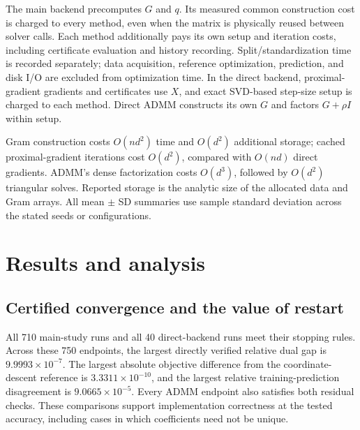 \documentclass{article}
\begin{document}
The main backend precomputes $G$ and $q$. Its measured common construction cost is charged to every method, even when the matrix is physically reused between solver calls. Each method additionally pays its own setup and iteration costs, including certificate evaluation and history recording. Split/standardization time is recorded separately; data acquisition, reference optimization, prediction, and disk I/O are excluded from optimization time. In the direct backend, proximal-gradient gradients and certificates use $X$, and exact SVD-based step-size setup is charged to each method. Direct ADMM constructs its own $G$ and factors $G+\rho I$ within setup.

Gram construction costs $O(nd^2)$ time and $O(d^2)$ additional storage; cached proximal-gradient iterations cost $O(d^2)$, compared with $O(nd)$ direct gradients. ADMM's dense factorization costs $O(d^3)$, followed by $O(d^2)$ triangular solves. Reported storage is the analytic size of the allocated data and Gram arrays. All mean $\pm$ SD summaries use sample standard deviation across the stated seeds or configurations.

\section{Results and analysis}
\subsection{Certified convergence and the value of restart}
All 710 main-study runs and all 40 direct-backend runs meet their stopping rules. Across these 750 endpoints, the largest directly verified relative dual gap is $9.9993\times10^{-7}$. The largest absolute objective difference from the coordinate-descent reference is $3.3311\times10^{-10}$, and the largest relative training-prediction disagreement is $9.0665\times10^{-5}$. Every ADMM endpoint also satisfies both residual checks. These comparisons support implementation correctness at the tested accuracy, including cases in which coefficients need not be unique.

\begin{table}[t]
\centering\scriptsize

\caption{Baseline results at $\lambda/\lambda_{\max}=0.03$: mean $\pm$ sample SD over five seeds. Total time includes common sufficient-statistic construction, method setup, and iterations. Setup here is method-specific and excludes the separately charged common construction cost. Nonzero counts use a $10^{-6}$ threshold.}
\label{tab:baseline}
\end{table}
\end{document}
